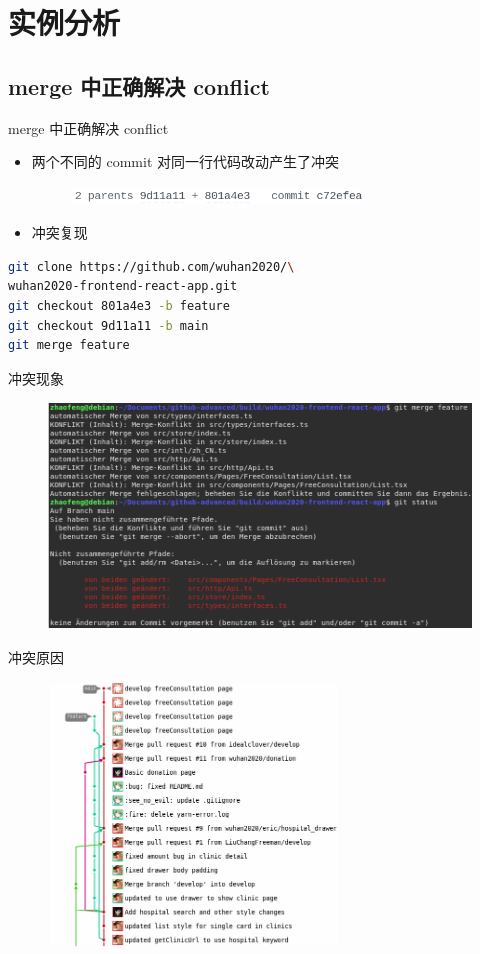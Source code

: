 \documentclass[notheorems,xetex]{beamer}
\theoremstyle{definition}
\begin{document}
\section{实例分析}
\subsection{merge 中正确解决 conflict}
\begin{frame}[fragile]{merge 中正确解决 conflict}
\begin{itemize}
\item 两个不同的 commit 对同一行代码改动产生了冲突
     \begin{figure}
	\centering
	\includegraphics[height=0.5cm]{conflict.png}
	\end{figure}
\item 冲突复现
\end{itemize}
\begin{lstlisting}[language=bash]
git clone https://github.com/wuhan2020/\
wuhan2020-frontend-react-app.git
git checkout 801a4e3 -b feature
git checkout 9d11a11 -b main
git merge feature
\end{lstlisting}

\end{frame}
\begin{frame}{冲突现象}

\begin{figure}
	\centering
	\includegraphics[height=6cm]{phenomenon.png}
\end{figure}
\end{frame}
\begin{frame}{冲突原因}
\begin{figure}
	\centering
	\includegraphics[height=7cm]{deps.png}
\end{figure}
\end{frame}
\end{document}
